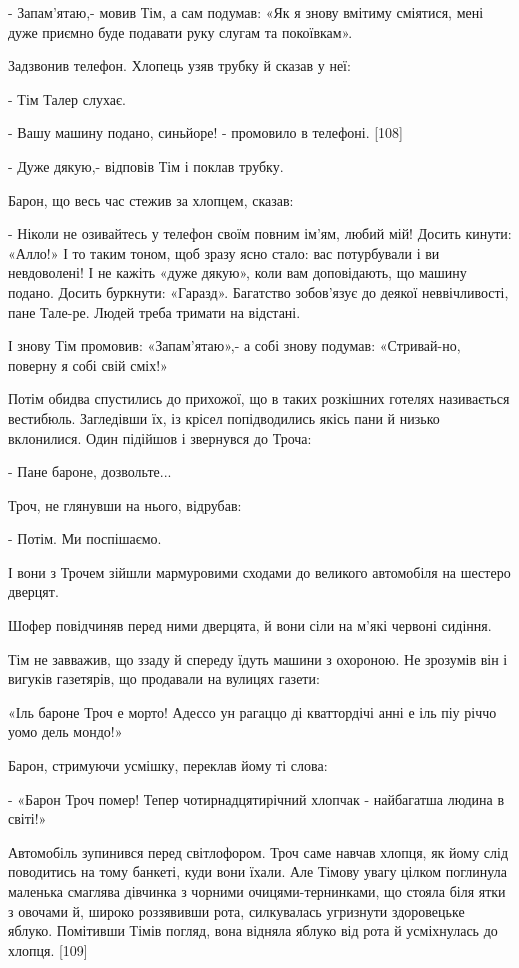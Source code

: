 - Запам'ятаю,- мовив Тім, а сам подумав: «Як я знову вмітиму сміятися, мені дуже приємно буде подавати руку слугам та покоївкам».

Задзвонив телефон. Хлопець узяв трубку й сказав у неї:

- Тім Талер слухає.

- Вашу машину подано, синьйоре! - промовило в телефоні. [108]

- Дуже дякую,- відповів Тім і поклав трубку.

Барон, що весь час стежив за хлопцем, сказав:

- Ніколи не озивайтесь у телефон своїм повним ім'ям, любий мій! Досить кинути: «Алло!» І то таким тоном, щоб зразу ясно стало: вас потурбували і ви невдоволені! І не кажіть «дуже дякую», коли вам доповідають, що машину подано. Досить буркнути: «Гаразд». Багатство зобов'язує до деякої неввічливості, пане Тале-ре. Людей треба тримати на відстані.

І знову Тім промовив: «Запам'ятаю»,- а собі знову подумав: «Стривай-но, поверну я собі свій сміх!»

Потім обидва спустились до прихожої, що в таких розкішних готелях називається вестибюль. Загледівши їх, із крісел попідводились якісь пани й низько вклонилися. Один підійшов і звернувся до Троча:

- Пане бароне, дозвольте...

Троч, не глянувши на нього, відрубав:

- Потім. Ми поспішаємо.

І вони з Трочем зійшли мармуровими сходами до великого автомобіля на шестеро дверцят.

Шофер повідчиняв перед ними дверцята, й вони сіли на м'які червоні сидіння.

Тім не завважив, що ззаду й спереду їдуть машини з охороною. Не зрозумів він і вигуків газетярів, що продавали на вулицях газети:

«Іль бароне Троч е морто! Адессо ун рагаццо ді кваттордічі анні е іль піу річчо уомо дель мондо!»

Барон, стримуючи усмішку, переклав йому ті слова:

- «Барон Троч помер! Тепер чотирнадцятирічний хлопчак - найбагатша людина в світі!»

Автомобіль зупинився перед світлофором. Троч саме навчав хлопця, як йому слід поводитись на тому банкеті, куди вони їхали. Але Тімову увагу цілком поглинула маленька смаглява дівчинка з чорними очицями-тернинками, що стояла біля ятки з овочами й, широко роззявивши рота, силкувалась угризнути здоровецьке яблуко. Помітивши Тімів погляд, вона відняла яблуко від рота й усміхнулась до хлопця. [109]

